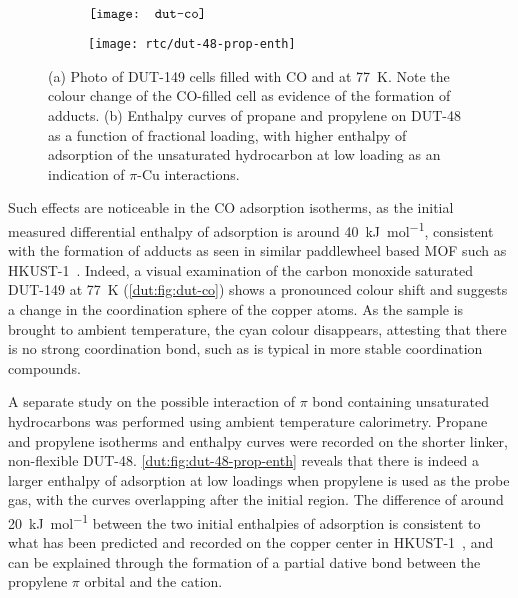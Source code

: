 \begin{figure}[htb]
    \centering
    \begin{subfigure}[h]{0.5\linewidth}
        \centering
        \(\vcenter{\hbox{{\texttt{[image: dut-co]}}}}\)%
        \caption{}\label{dut:fig:dut-co}
    \end{subfigure}%
    \begin{subfigure}[c]{0.5\linewidth}
        \texttt{[image: rtc/dut-48-prop-enth]}%
        \caption{}\label{dut:fig:dut-48-prop-enth}
    \end{subfigure}%
    \caption{(a) Photo of DUT-149 cells
    filled with CO and  at \SI{77}{\kelvin}. Note the 
    colour change of the CO-filled cell as evidence of the formation of 
     adducts.
    (b) Enthalpy curves of propane and propylene on DUT-48 as 
    a function of fractional loading, with higher enthalpy of 
    adsorption of the unsaturated hydrocarbon at low loading as an 
    indication of \( \pi \)-Cu interactions.
    }\label{dut:fig:dut-48-prop}
\end{figure}

Such effects are noticeable in the CO adsorption isotherms, 
as the initial measured differential enthalpy of adsorption is around 
\SI{40}{\kilo\joule\per\mol}, consistent with the formation of 
 adducts as seen in similar paddlewheel based 
\gls{MOF} such as HKUST-1~\cite{prestipinoLocalStructureFramework2006}. 
Indeed, a visual examination of the carbon monoxide saturated 
DUT-149 at \SI{77}{\kelvin} 
(\autoref{dut:fig:dut-co}) shows a pronounced colour shift and 
suggests a change in the coordination sphere of the copper 
atoms. As the sample is brought to ambient temperature, the 
cyan colour disappears, attesting that there is no strong 
coordination bond, such as is typical in more stable 
 coordination compounds.

A separate study on the possible interaction of 
\(\pi\) bond containing unsaturated hydrocarbons was performed
using ambient temperature calorimetry. Propane and propylene 
isotherms and enthalpy curves were recorded on the shorter 
linker, non-flexible DUT-48. \autoref{dut:fig:dut-48-prop-enth}
reveals that there is indeed a larger enthalpy of adsorption
at low loadings when propylene is used as the probe gas, with 
the curves overlapping after the initial region. The difference 
of around \SI{20}{\kilo\joule\per\mol} between the two initial
enthalpies of adsorption is consistent to what has been predicted
and recorded on the copper center in 
HKUST-1~\cite{rubesAdsorptionPropanePropylene2013}, and can
be explained through the formation of a partial dative bond
between the propylene \(\pi\) orbital and the 
cation. 

